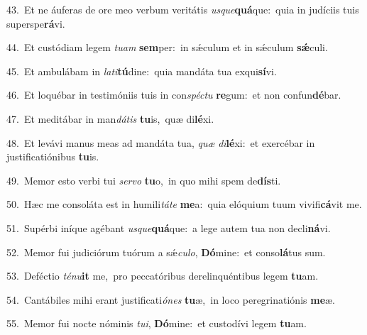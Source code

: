 {\numbfont\textcolor{\numbcolor}{43.}}~Et ne áuferas de ore meo verbum veritátis \textit{us}\-\textit{que}\textbf{quá}que:~\star quia in judíciis tuis superspe\-\textbf{rá}\-vi.\par
{\numbfont\textcolor{\numbcolor}{44.}}~Et custódiam legem \textit{tu}\-\textit{am} \textbf{sem}\-per:~\star in sǽculum et in sǽculum \textbf{sǽ}\-culi.\par
{\numbfont\textcolor{\numbcolor}{45.}}~Et ambulábam in \textit{la}\-\textit{ti}\textbf{tú}dine:~\star quia mandáta tua exqui\-\textbf{sí}\-vi.\par
{\numbfont\textcolor{\numbcolor}{46.}}~Et loquébar in testimóniis tuis in con\-\textit{spéc}\-\textit{tu} \textbf{re}\-gum:~\star et non confun\-\textbf{dé}\-bar.\par
{\numbfont\textcolor{\numbcolor}{47.}}~Et meditábar in man\-\textit{dá}\-\textit{tis} \textbf{tu}\-is,~\star quæ di\-\textbf{lé}\-xi.\par
{\numbfont\textcolor{\numbcolor}{48.}}~Et levávi manus meas ad mandáta tua, \textit{quæ} \textit{di}\-\textbf{lé}xi:~\star et exercébar in justificatiónibus \textbf{tu}\-is.\par
{\numbfont\textcolor{\numbcolor}{49.}}~Memor esto verbi tui \textit{ser}\-\textit{vo} \textbf{tu}\-o,~\star in quo mihi spem de\-\textbf{dís}\-ti.\par
{\numbfont\textcolor{\numbcolor}{50.}}~Hæc me consoláta est in humili\-\textit{tá}\-\textit{te} \textbf{me}\-a:~\star quia elóquium tuum vivifi\-\textbf{cá}\-vit me.\par
{\numbfont\textcolor{\numbcolor}{51.}}~Supérbi iníque agébant \textit{us}\-\textit{que}\textbf{quá}que:~\star a lege autem tua non decli\-\textbf{ná}\-vi.\par
{\numbfont\textcolor{\numbcolor}{52.}}~Memor fui judiciórum tuórum a sǽ\-\textit{cu}\-\textit{lo}, \textbf{Dó}\-mine:~\star et conso\-\textbf{lá}\-tus sum.\par
{\numbfont\textcolor{\numbcolor}{53.}}~Deféctio \textit{té}\-\textit{nu}\textbf{it} me,~\star pro peccatóribus derelinquéntibus legem \textbf{tu}\-am.\par
{\numbfont\textcolor{\numbcolor}{54.}}~Cantábiles mihi erant justificati\-\textit{ó}\-\textit{nes} \textbf{tu}\-æ,~\star in loco peregrinatiónis \textbf{me}\-æ.\par
{\numbfont\textcolor{\numbcolor}{55.}}~Memor fui nocte nóminis \textit{tu}\-\textit{i}, \textbf{Dó}\-mine:~\star et custodívi legem \textbf{tu}\-am.\par
